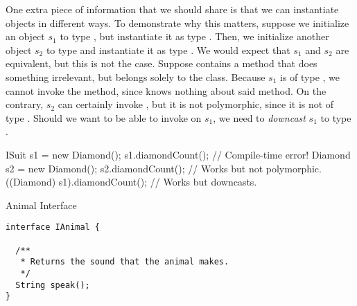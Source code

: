 One extra piece of information that we should share is that we can instantiate objects in different ways. To demonstrate why this matters, suppose we initialize an object $s_1$ to type , but instantiate it as type . Then, we initialize another object $s_2$ to type  and instantiate it as type . We would expect that $s_1$ and $s_2$ are equivalent, but this is not the case. Suppose  contains a method  that does something irrelevant, but belongs solely to the  class. Because $s_1$ is of type , we cannot invoke the  method, since  knows nothing about said method. On the contrary, $s_2$ can certainly invoke , but it is not polymorphic, since it is not of type . Should we want to be able to invoke  on $s_1$, we need to \textit{downcast} $s_1$ to type .

\begin{verbnobox}[\small]
ISuit s1 = new Diamond();
s1.diamondCount();             // Compile-time error!
Diamond s2 = new Diamond();
s2.diamondCount();             // Works but not polymorphic.
((Diamond) s1).diamondCount(); // Works but downcasts.
\end{verbnobox}


\begin{cl}[]{Animal Interface}
\begin{lstlisting}[language=MyJava]
interface IAnimal {

  /**
   * Returns the sound that the animal makes.
   */
  String speak();
}
\end{lstlisting}
\end{cl}

